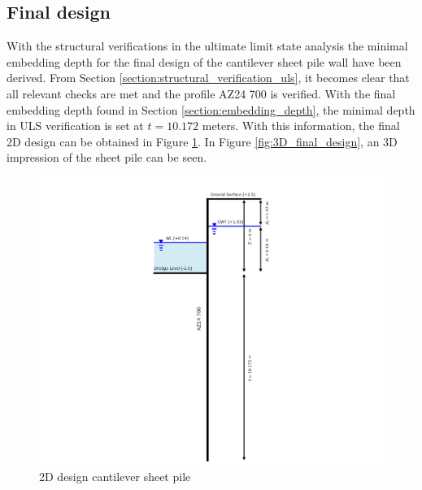 


\subsection{Final design}

With the structural verifications in the ultimate limit state analysis the minimal embedding depth for the final design of the cantilever sheet pile wall have been derived. From Section \ref{section:structural_verification_uls}, it becomes clear that all relevant checks are met and the profile AZ24 700 is verified. With the final embedding depth found in Section \ref{section:embedding_depth}, the minimal depth in ULS verification is set at $t = 10.172$ meters. With this information, the final 2D design can be obtained in Figure \ref{fig:final_design}. In Figure \ref{fig:3D_final_design}, an 3D impression of the sheet pile can be seen.

\begin{figure}[H]
    \centering
    \includegraphics[width=0.90\linewidth]{figures/ch8/final_design.png}
    \caption{2D design cantilever sheet pile}
    \label{fig:final_design}
\end{figure}

